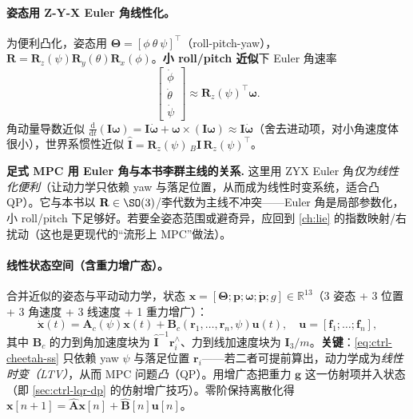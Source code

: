 \paragraph{姿态用 Z-Y-X Euler 角线性化。}
为便利凸化，姿态用 $\boldsymbol{\Theta}=[\phi\ \theta\ \psi]^\top$（roll-pitch-yaw），$\mathbf{R}=\mathbf{R}_z(\psi)\mathbf{R}_y(\theta)\mathbf{R}_x(\phi)$\cite{dicarlo2018cheetah}。\textbf{小 roll/pitch 近似}下 Euler 角速率
\begin{equation}
  \begin{bmatrix}\dot\phi\\\dot\theta\\\dot\psi\end{bmatrix}\approx\mathbf{R}_z(\psi)^\top\boldsymbol{\omega}.
  \label{eq:ctrl-euler-rate}
\end{equation}
角动量导数近似 $\frac{\mathrm d}{\mathrm dt}(\mathbf{I}\boldsymbol{\omega})=\mathbf{I}\dot{\boldsymbol{\omega}}+\boldsymbol{\omega}\times(\mathbf{I}\boldsymbol{\omega})\approx\mathbf{I}\dot{\boldsymbol{\omega}}$（舍去进动项，对小角速度体很小），世界系惯性近似 $\hat{\mathbf{I}}=\mathbf{R}_z(\psi)\,{}_B\mathbf{I}\,\mathbf{R}_z(\psi)^\top$。

\begin{note}
\textbf{足式 MPC 用 Euler 角与本书李群主线的关系.}\;
这里用 ZYX Euler 角\emph{仅为线性化便利}（让动力学只依赖 yaw 与落足位置，从而成为线性时变系统，适合凸 QP）。它与本书以 $\mathbf{R}\in\SO(3)$/李代数为主线不冲突——Euler 角是局部参数化，小 roll/pitch 下足够好。若要全姿态范围或避奇异，应回到 \cref{ch:lie} 的指数映射/右扰动（这也是更现代的“流形上 MPC”做法）。
\end{note}

\paragraph{线性状态空间（含重力增广态）。}
合并近似的姿态与平动动力学，状态 $\mathbf{x}=[\boldsymbol{\Theta};\mathbf{p};\boldsymbol{\omega};\dot{\mathbf{p}};g]\in\mathbb{R}^{13}$（3 姿态 + 3 位置 + 3 角速度 + 3 线速度 + 1 重力增广）\cite{dicarlo2018cheetah}：
\begin{equation}
  \dot{\mathbf{x}}(t)=\mathbf{A}_c(\psi)\mathbf{x}(t)+\mathbf{B}_c(\mathbf{r}_1,\dots,\mathbf{r}_n,\psi)\mathbf{u}(t),\quad\mathbf{u}=[\mathbf{f}_1;\dots;\mathbf{f}_n],
  \label{eq:ctrl-cheetah-ss}
\end{equation}
其中 $\mathbf{B}_c$ 的力到角加速度块为 $\hat{\mathbf{I}}^{-1}\mathbf{r}_i^\wedge$、力到线加速度块为 $\mathbf{I}_3/m$。\textbf{关键}：\cref{eq:ctrl-cheetah-ss} 只依赖 yaw $\psi$ 与落足位置 $\mathbf{r}_i$——若二者可提前算出，动力学成为\emph{线性时变（LTV）}，从而 MPC 问题\emph{凸}（QP）。用增广态把重力 $\mathbf{g}$ 这一仿射项并入状态（即 \cref{sec:ctrl-lqr-dp} 的仿射增广技巧）。零阶保持离散化得 $\mathbf{x}[n+1]=\hat{\mathbf{A}}\mathbf{x}[n]+\hat{\mathbf{B}}[n]\mathbf{u}[n]$。

